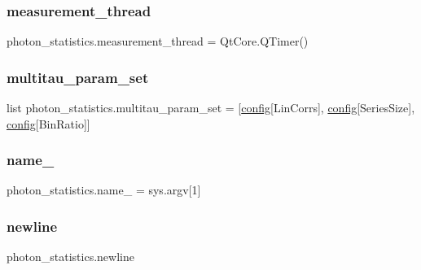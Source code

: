 \subsubsection{\texorpdfstring{measurement\+\_\+thread}{measurement\_thread}}
{\footnotesize\ttfamily photon\+\_\+statistics.\+measurement\+\_\+thread = Qt\+Core.\+Q\+Timer()}

\mbox{\label{namespacephoton__statistics_a3c57d728c4b1cdcb2b6ca63bc6adfc4d}} 
\subsubsection{\texorpdfstring{multitau\+\_\+param\+\_\+set}{multitau\_param\_set}}
{\footnotesize\ttfamily list photon\+\_\+statistics.\+multitau\+\_\+param\+\_\+set = \mbox{[}\hyperlink{namespacephoton__statistics_a4176c548148b1c86da6ddf320ab00e90}{config}\mbox{[}\textquotesingle{}Lin\+Corrs\textquotesingle{}\mbox{]}, \hyperlink{namespacephoton__statistics_a4176c548148b1c86da6ddf320ab00e90}{config}\mbox{[}\textquotesingle{}Series\+Size\textquotesingle{}\mbox{]}, \hyperlink{namespacephoton__statistics_a4176c548148b1c86da6ddf320ab00e90}{config}\mbox{[}\textquotesingle{}Bin\+Ratio\textquotesingle{}\mbox{]}\mbox{]}}

\mbox{\label{namespacephoton__statistics_a729c361165a662402f88b585477d2ee6}} 
\subsubsection{\texorpdfstring{name\+\_\+}{name\_}}
{\footnotesize\ttfamily photon\+\_\+statistics.\+name\+\_\+ = sys.\+argv\mbox{[}1\mbox{]}}

\mbox{\label{namespacephoton__statistics_a6c6d01b62f113634193642d2dda3124a}} 
\subsubsection{\texorpdfstring{newline}{newline}}
{\footnotesize\ttfamily photon\+\_\+statistics.\+newline}

